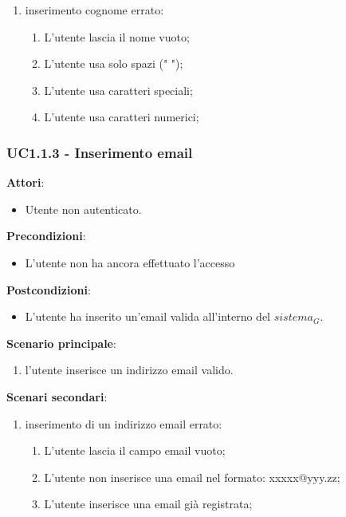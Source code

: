 \begin{enumerate}
    \item inserimento cognome errato:
    \begin{enumerate}
        \item L'utente lascia il nome vuoto;
        \item L'utente usa solo spazi (" ");
        \item L'utente usa caratteri speciali;
        \item L'utente usa caratteri numerici;
    \end{enumerate}    
\end{enumerate}

\subsubsection{UC1.1.3 - Inserimento email}\label{usecase:1_1_3}
\textbf{Attori}:
\begin{itemize}
    \item Utente non autenticato.
\end{itemize}
\textbf{Precondizioni}:
\begin{itemize}
    \item L'utente non ha ancora effettuato l'accesso
\end{itemize}
\textbf{Postcondizioni}:
\begin{itemize}
    \item L'utente ha inserito un'email valida all'interno del $\textit{sistema}_G$.
\end{itemize}
\textbf{Scenario principale}:
\begin{enumerate}
    \item l'utente inserisce un indirizzo email valido.
\end{enumerate}
\textbf{Scenari secondari}:

\begin{enumerate}
    \item inserimento di un indirizzo email errato:
    \begin{enumerate}
            \item L'utente lascia il campo email vuoto;
            \item L'utente non inserisce una email nel formato: xxxxx@yyy.zz;
            \item L'utente inserisce una email già registrata;
        \end{enumerate} 
\end{enumerate}

